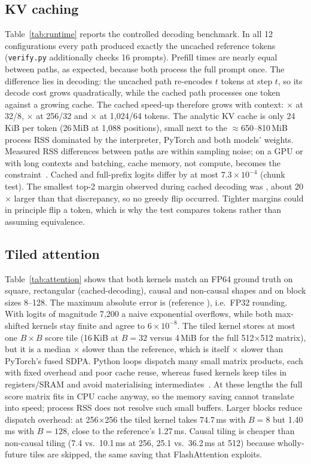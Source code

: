 \subsection{KV caching}
Table~\ref{tab:runtime} reports the controlled decoding benchmark. In all 12 configurations every path produced exactly the uncached reference tokens (\texttt{verify.py} additionally checks 16 prompts). Prefill times are nearly equal between paths, as expected, because both process the full prompt once. The difference lies in decoding: the uncached path re-encodes $t$ tokens at step $t$, so its decode cost grows quadratically, while the cached path processes one token against a growing cache. The cached speed-up therefore grows with context: \CacheS$\times$ at 32/8, \CacheM$\times$ at 256/32 and \CacheL$\times$ at 1{,}024/64 tokens. The analytic KV cache is only 24\,KiB per token (26\,MiB at 1{,}088 positions), small next to the $\approx$650--810\,MiB process RSS dominated by the interpreter, PyTorch and both models' weights. Measured RSS differences between paths are within sampling noise; on a GPU or with long contexts and batching, cache memory, not compute, becomes the constraint~\cite{paged}. Cached and full-prefix logits differ by at most $7.3\times10^{-4}$ (chunk test). The smallest top-2 margin observed during cached decoding was \MinMargin{}, about 20$\times$ larger than that discrepancy, so no greedy flip occurred. Tighter margins could in principle flip a token, which is why the test compares tokens rather than assuming equivalence.

\subsection{Tiled attention}
Table~\ref{tab:attention} shows that both kernels match an FP64 ground truth on square, rectangular (cached-decoding), causal and non-causal shapes and on block sizes 8--128. The maximum absolute error is \AttnMaxErr{} (reference \AttnRefMaxErr), i.e.\ FP32 rounding. With logits of magnitude 7{,}200 a naive exponential overflows, while both max-shifted kernels stay finite and agree to $6\times10^{-8}$. The tiled kernel stores at most one $B\times B$ score tile (16\,KiB at $B{=}32$ versus 4\,MiB for the full 512$\times$512 matrix), but it is a median \TiledSlow$\times$ slower than the reference, which is itself \SdpaFast$\times$ slower than PyTorch's fused SDPA. Python loops dispatch many small matrix products, each with fixed overhead and poor cache reuse, whereas fused kernels keep tiles in registers/SRAM and avoid materialising intermediates~\cite{flash,flash2}. At these lengths the full score matrix fits in CPU cache anyway, so the memory saving cannot translate into speed; process RSS does not resolve such small buffers. Larger blocks reduce dispatch overhead: at 256$\times$256 the tiled kernel takes 74.7\,ms with $B{=}8$ but 1.40\,ms with $B{=}128$, close to the reference's 1.27\,ms. Causal tiling is cheaper than non-causal tiling (7.4 vs.\ 10.1\,ms at 256, 25.1 vs.\ 36.2\,ms at 512) because wholly-future tiles are skipped, the same saving that FlashAttention exploits.

